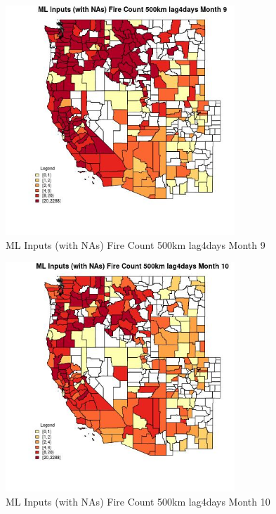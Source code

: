 \begin{figure} 
\centering  
\includegraphics[width=0.77\textwidth]{Code_Outputs/Report_ML_input_PM25_Step4_part_e_de_duplicated_aves_compiled_2019-05-20wNAs_CountyFire_Count_500km_lag4daysmedianMonth9.jpg} 
\caption{\label{fig:Report_ML_input_PM25_Step4_part_e_de_duplicated_aves_compiled_2019-05-20wNAsCountyFire_Count_500km_lag4daysmedianMonth9}ML Inputs (with NAs) Fire Count 500km lag4days Month 9} 
\end{figure} 
 

\begin{figure} 
\centering  
\includegraphics[width=0.77\textwidth]{Code_Outputs/Report_ML_input_PM25_Step4_part_e_de_duplicated_aves_compiled_2019-05-20wNAs_CountyFire_Count_500km_lag4daysmedianMonth10.jpg} 
\caption{\label{fig:Report_ML_input_PM25_Step4_part_e_de_duplicated_aves_compiled_2019-05-20wNAsCountyFire_Count_500km_lag4daysmedianMonth10}ML Inputs (with NAs) Fire Count 500km lag4days Month 10} 
\end{figure} 
 

